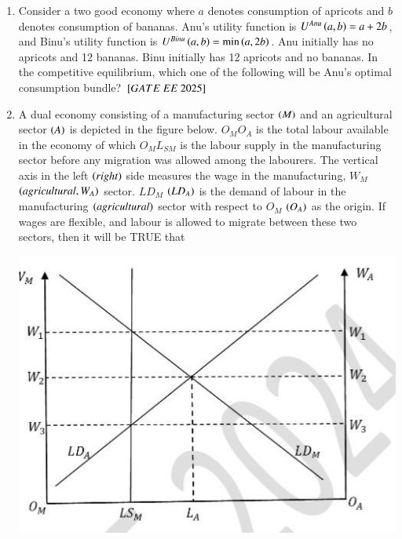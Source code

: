 \documentclass[journal,12pt,onecolumn]{IEEEtran}
\theoremstyle{remark}
\begin{document}
\begin{enumerate}
\item Consider a two good economy where $a$ denotes consumption of apricots and $b$ denotes consumption of bananas. Anu's utility function is $U^{Anu} \left(a, b\right) = a + 2b$, and Binu's utility function is $U^{Binu} \left(a, b\right) = \min \left(a, 2b\right)$. Anu initially has no apricots and 12 bananas. Binu initially has 12 apricots and no bananas. In the competitive equilibrium, which one of the following will be Anu's optimal consumption bundle?
\hfill $\sbrak{GATE\ EE\ 2025}$
\begin{enumerate}
\end{enumerate}
 
\item A dual economy consisting of a manufacturing sector  $\left(M\right)$ and an agricultural sector  $\left(A\right)$ is depicted in the figure below. $O_M O_A$ is the total labour available in the economy of which $O_M L_{SM}$ is the labour supply in the manufacturing sector before any migration was allowed among the labourers. The vertical axis in the left  $\left(right\right)$ side measures the wage in the manufacturing, $W_M$  $\left(agricultural, W_A\right)$ sector. $LD_M$  $\left(LD_A\right)$ is the demand of labour in the manufacturing  $\left(agricultural\right)$ sector with respect to $O_M$  $\left(O_A\right)$ as the origin. If wages are flexible, and labour is allowed to migrate between these two sectors, then it will be TRUE that

\includegraphics[scale=0.5]{figs/Q47.jpg}


\end{enumerate}
\end{document}
